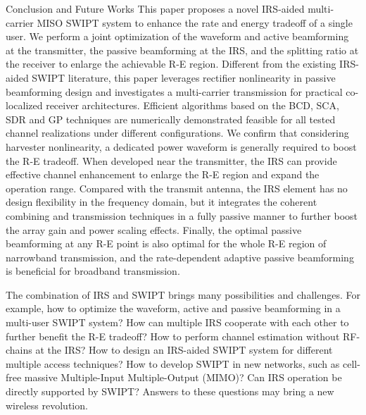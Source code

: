 \documentclass[journal]{IEEEtran}
\begin{document}
	\begin{section}{Conclusion and Future Works}\label{se:conclusion_and_future_works}
		This paper proposes a novel IRS-aided multi-carrier MISO SWIPT system to enhance the rate and energy tradeoff of a single user. We perform a joint optimization of the waveform and active beamforming at the transmitter, the passive beamforming at the IRS, and the splitting ratio at the receiver to enlarge the achievable R-E region. Different from the existing IRS-aided SWIPT literature, this paper leverages rectifier nonlinearity in passive beamforming design and investigates a multi-carrier transmission for practical co-localized receiver architectures. Efficient algorithms based on the BCD, SCA, SDR and GP techniques are numerically demonstrated feasible for all tested channel realizations under different configurations. We confirm that considering harvester nonlinearity, a dedicated power waveform is generally required to boost the R-E tradeoff. When developed near the transmitter, the IRS can provide effective channel enhancement to enlarge the R-E region and expand the operation range. Compared with the transmit antenna, the IRS element has no design flexibility in the frequency domain, but it integrates the coherent combining and transmission techniques in a fully passive manner to further boost the array gain and power scaling effects. Finally, the optimal passive beamforming at any R-E point is also optimal for the whole R-E region of narrowband transmission, and the rate-dependent adaptive passive beamforming is beneficial for broadband transmission.

		The combination of IRS and SWIPT brings many possibilities and challenges. For example, how to optimize the waveform, active and passive beamforming in a multi-user SWIPT system? How can multiple IRS cooperate with each other to further benefit the R-E tradeoff? How to perform channel estimation without RF-chains at the IRS? How to design an IRS-aided SWIPT system for different multiple access techniques? How to develop SWIPT in new networks, such as cell-free massive Multiple-Input Multiple-Output (MIMO)? Can IRS operation be directly supported by SWIPT? Answers to these questions may bring a new wireless revolution.
	\end{section}


	
	
\end{document}
